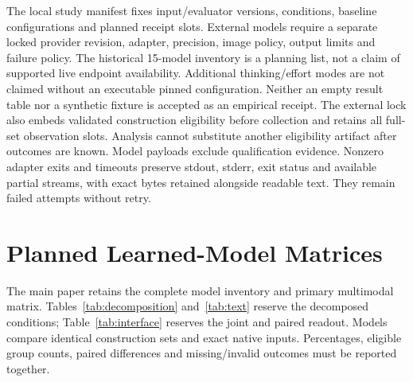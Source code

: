 \documentclass[10pt,twocolumn,letterpaper]{article}
\begin{document}
The local study manifest fixes input/evaluator versions, conditions,
baseline configurations and planned receipt slots. External models
require a separate locked provider revision, adapter, precision,
image policy, output limits and failure policy. The historical
15-model inventory is a planning list, not a claim of supported
live endpoint availability. Additional thinking/effort modes are not
claimed without an executable pinned configuration.
Neither an empty result table nor a synthetic fixture is accepted
as an empirical receipt.
The external lock also embeds validated construction eligibility
before collection and retains all full-set observation slots.
Analysis cannot substitute another eligibility artifact after
outcomes are known. Model payloads exclude qualification evidence.
Nonzero adapter exits and timeouts preserve stdout, stderr, exit
status and available partial streams, with exact bytes retained
alongside readable text. They remain failed attempts without retry.

\section{Planned Learned-Model Matrices}
The main paper retains the complete model inventory and primary
multimodal matrix. Tables~\ref{tab:decomposition} and~\ref{tab:text}
reserve the decomposed conditions; Table~\ref{tab:interface} reserves
the joint and paired readout. Models compare identical
construction sets and exact native inputs. Percentages, eligible
group counts, paired differences and missing/invalid outcomes
must be reported together.

\begin{table}[t]
\centering\small
\caption{Planned VLM condition decomposition, with all results blank.
Atomic is binding-only accuracy; No-image and Oracle are exact repair
under their respective information conditions. Repair$|$Bind is
multimodal repair conditional on correct binding. Invalid is the
multimodal invalid-output rate.}
\label{tab:decomposition}

\end{table}

\begin{table}[t]
\centering\small
\caption{Planned task-aligned interface readout; all entries are
unmeasured. $J$ is the equal-group joint-condition failure percentage;
$n_{AO}$ and $G_{AO}$ count jointly competent observations and groups.
$\Delta$Repair is multimodal minus oracle exact repair, and
$\Delta$Bind is multimodal minus atomic binding, in equal-group
percentage points. Full and qualified versions, micro estimates,
all eight contingency counts and shared-group sensitivity intervals
accompany the complete machine-readable analysis. Empty eligibility
remains undefined.}
\label{tab:interface}

\par\medskip
\caption{Planned text-only model conditions; no image-bearing score
is imputed. Empty cells are unmeasured values.}
\label{tab:text}

\end{table}
\end{document}
